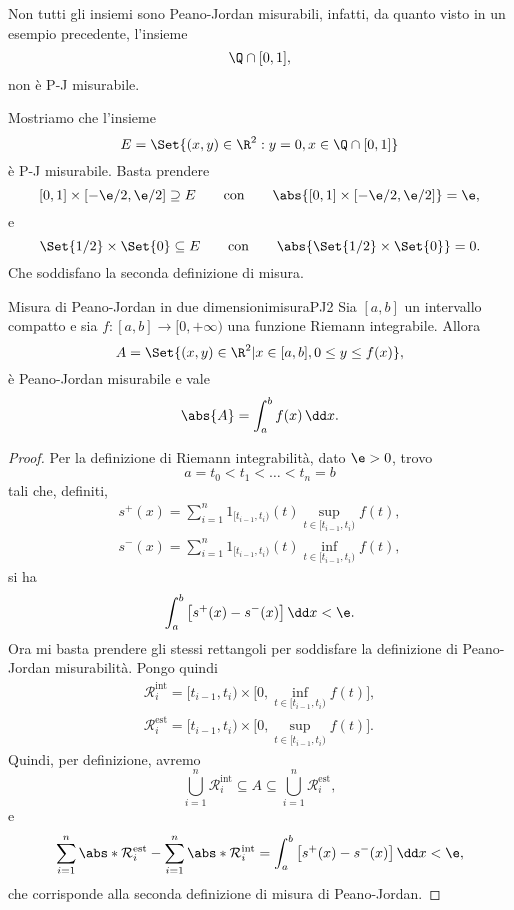 \begin{ese}
	Non tutti gli insiemi sono Peano-Jordan misurabili, infatti, da quanto visto in un esempio precedente, l'insieme
	\[
		\Q\cap [0,1],
	\]
	non è P-J misurabile.
\end{ese}

\begin{ese}
	Mostriamo che l'insieme
	\[
		E=\Set{(x,y)\in\R^2:y=0,x\in\Q\cap[0,1]}
	\]
	è P-J misurabile.
	Basta prendere
	\[
		[0,1]\times[-\e/2,\e/2]\supseteq E \qquad\text{con}\qquad\abs{[0,1]\times[-\e/2,\e/2]}=\e,
	\]
	e
	\[
		\Set{1/2}\times\Set{0}\subseteq E \qquad\text{con}\qquad\abs{\Set{1/2}\times\Set{0}}=0.
	\]
	Che soddisfano la seconda definizione di misura.
\end{ese}
%
%
\begin{prop}{Misura di Peano-Jordan in due dimensioni}{misuraPJ2}
	Sia \([a,b]\) un intervallo compatto e sia \(f\colon [a,b] \to [0,+\infty)\) una funzione Riemann integrabile.
	Allora
	\[
		A=\Set{(x,y)\in\R^2 | x\in [a,b], 0 \le y \le f(x)},
	\]
	è Peano-Jordan misurabile e vale
	\[
		\abs{A} = \int_a^b f(x)\,\dd x.
	\]
\end{prop}

\begin{proof}
	Per la definizione di Riemann integrabilità, dato \(\e>0\), trovo
	\[
		a=t_0 < t_1 < \ldots < t_n=b
	\]
	tali che, definiti,
	\begin{gather*}
		s^+(x) = \sum_{i=1}^n 1_{[t_{i-1},t_i)}(t) \sup_{t\in[t_{i-1},t_i)}f(t),\\
		s^-(x) = \sum_{i=1}^n 1_{[t_{i-1},t_i)}(t) \inf_{t\in[t_{i-1},t_i)}f(t),
	\end{gather*}
	si ha
	\[
		\int_a^b \big[s^+(x)-s^-(x)\big]\,\dd x < \e.
	\]
	Ora mi basta prendere gli stessi rettangoli per soddisfare la definizione di Peano-Jordan misurabilità.
	Pongo quindi
	\begin{gather*}
		\mathcal{R}_i^\text{int} = [t_{i-1},t_i) \times \big[0,\inf_{t\in[t_{i-1},t_i)} f(t)\big],\\
		\mathcal{R}_i^\text{est} = [t_{i-1},t_i) \times \big[0,\sup_{t\in[t_{i-1},t_i)} f(t)\big].
	\end{gather*}
	Quindi, per definizione, avremo
	\[
		\bigcup_{i=1}^n \mathcal{R}_i^\text{int} \subseteq A \subseteq \bigcup_{i=1}^n \mathcal{R}_i^\text{est},
	\]
	e
	\[
		\sum_{i=1}^n \abs*{\mathcal{R}_i^\text{est}} - \sum_{i=1}^n \abs*{\mathcal{R}_i^\text{int}} = \int_a^b \big[s^+(x)-s^-(x)\big]\,\dd x < \e,
	\]
	che corrisponde alla seconda definizione di misura di Peano-Jordan.
\end{proof}


